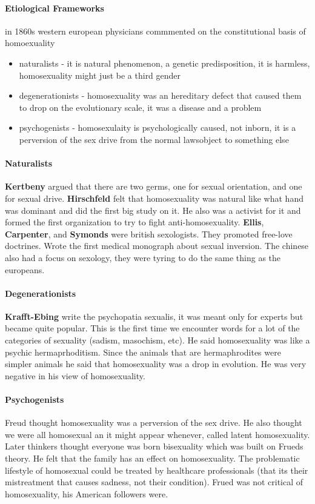 \documentclass{article}
\begin{document}
\paragraph{Etiological Frameworks}
\label{par:etiological_frameworks}
in 1860s western european physicians commmented on the constitutional basis of homoexuality
\begin{itemize}
	\item naturalists - it is natural phenomenon, a genetic predisposition, it is harmless, homosexuality might just be a third gender
	\item degenerationists - homosexuality was an hereditary defect that caused them to drop on the evolutionary scale, it was a disease and a problem
	\item psychogenists - homosexulaity is psychologically caused, not inborn, it is a perversion of the sex drive from the normal lawsobject to something else
\end{itemize}


\paragraph{Naturalists}
\label{par:naturalists}
\textbf{Kertbeny} argued that there are two germs, one for sexual orientation, and one for sexual drive. \textbf{Hirschfeld} felt that homosexuality was natural like what hand was dominant and did the first big study on it. He also was a activist for it and formed the first organization to try to fight anti-homosexuality. \textbf{Ellis}, \textbf{Carpenter}, and \textbf{Symonds} were british sexologists. They promoted free-love doctrines. Wrote the first medical monograph about sexual inversion. The chinese also had a focus on sexology, they were tyring to do the same thing as the europeans.

\paragraph{Degenerationists}
\label{par:degenerationists}
\textbf{Krafft-Ebing} write the psychopatia sexualis, it was meant only for experts but became quite popular. This is the first time we encounter words for a lot of the categories of sexuality (sadism, masochism, etc). He said homosexuality was like a psychic hermaprhoditism. Since the animals that are hermaphrodites were simpler animals he said that homosexuality was a drop in evolution. He was very negative in his view of homosexuality.

\paragraph{Psychogenists}
\label{par:psychogenists}
Freud thought homosexuality was a perversion of the sex drive. He also thought we were all homosexual an it might appear whenever, called latent homosexuality. Later thinkers thought everyone was born bisexuality which was built on Frueds theory. He felt that the family has an effect on homosexuality. The problematic lifestyle of homosexual could be treated by healthcare professionals (that its their mistreatment that causes sadness, not their condition). Frued was not critical of homosexuality, his American followers were.
\end{document}
